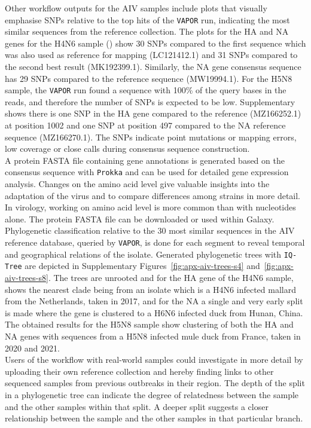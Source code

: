 Other workflow outputs for the \ac{AIV} samples include plots that visually emphasise \acp{SNP} relative to the top hits of the \texttt{VAPOR} run, indicating the most similar sequences from the reference collection. The plots for the \ac{HA} and \ac{NA} genes for the H4N6 sample () show 30 \acp{SNP} compared to the first sequence which was also used as reference for mapping (LC121412.1) and 31 \acp{SNP} compared to the second best result (MK192399.1). Similarly, the \ac{NA} gene consensus sequence has 29 \acp{SNP} compared to the reference sequence (MW19994.1). For the H5N8 sample, the \texttt{VAPOR} run found a sequence with 100\% of the query bases in the reads, and therefore the number of \acp{SNP} is expected to be low. Supplementary~ shows there is one \ac{SNP} in the \ac{HA} gene compared to the reference (MZ166252.1) at position 1002 and one \ac{SNP} at position 497 compared to the \ac{NA} reference sequence (MZ166270.1). The \acp{SNP} indicate point mutations or mapping errors, low coverage or close calls during consensus sequence construction. \\
A protein FASTA file containing gene annotations is generated based on the consensus sequence with \texttt{Prokka} and can be used for detailed gene expression analysis. Changes on the amino acid level give valuable insights into the adaptation of the virus and to compare differences among strains in more detail. In virology, working on amino acid level is more common than with nucleotides alone. The protein FASTA file can be downloaded or used within Galaxy.\\
Phylogenetic classification relative to the 30 most similar sequences in the \ac{AIV} reference database, queried by \texttt{VAPOR}, is done for each segment to reveal temporal and geographical relations of the isolate. Generated phylogenetic trees with \texttt{IQ-Tree} are depicted in Supplementary Figures~\ref{fig:apx-aiv-trees-s4} and~\ref{fig:apx-aiv-trees-s8}. The trees are unrooted and for the \ac{HA} gene of the H4N6 sample, shows the nearest clade being from an isolate which is a H4N6 infected mallard from the Netherlands, taken in 2017, and for the \ac{NA} a single and very early split is made where the gene is clustered to a H6N6 infected duck from Hunan, China. The obtained results for the H5N8 sample show clustering of both the \ac{HA} and \ac{NA} genes with sequences from a H5N8 infected mule duck from France, taken in 2020 and 2021.\\
Users of the workflow with real-world samples could investigate in more detail by uploading their own reference collection and hereby finding links to other sequenced samples from previous outbreaks in their region. The depth of the split in a phylogenetic tree can indicate the degree of relatedness between the sample and the other samples within that split. A deeper split suggests a closer relationship between the sample and the other samples in that particular branch.

